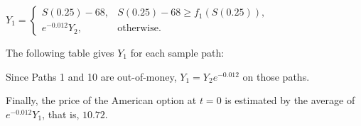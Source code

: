 $Y_1=\begin{cases}
S(0.25)-68,&S(0.25)-68\geq f_1(S(0.25)),\\
e^{-0.012}Y_2,&\text{otherwise}.
\end{cases}$

The following table gives $Y_1$ for each sample path:

\noindent{}

Since Paths 1 and 10 are out-of-money, $Y_1=Y_2e^{-0.012}$ on those paths.

Finally, the price of the American option at $t=0$ is estimated by the average of $e^{-0.012}Y_1$, that is, $10.72$.
